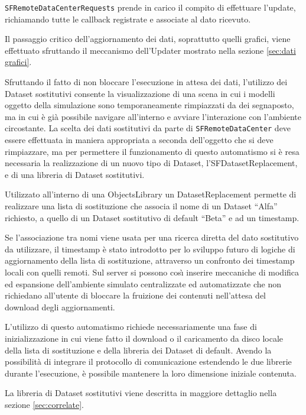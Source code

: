 \texttt{SFRemoteDataCenterRequests} prende in carico il compito di effettuare l'update, richiamando tutte le callback registrate e associate al dato ricevuto.

Il passaggio critico dell'aggiornamento dei dati, soprattutto quelli grafici, viene effettuato sfruttando il meccanismo dell'Updater mostrato nella sezione \ref{sec:dati grafici}.

Sfruttando il fatto di non bloccare l'esecuzione in attesa dei dati, l'utilizzo dei Dataset sostitutivi consente la visualizzazione di una scena in cui i modelli oggetto della simulazione sono temporaneamente rimpiazzati da dei segnaposto, ma in cui \`e gi\`a possibile navigare all'interno e avviare l'interazione con l'ambiente circostante. La scelta dei dati sostitutivi da parte di \texttt{SFRemoteDataCenter} deve essere effettuata in maniera appropriata a seconda dell'oggetto che si deve rimpiazzare, ma per permettere il funzionamento di questo automatismo si \`e resa necessaria la realizzazione di un nuovo tipo di Dataset, l'SFDatasetReplacement, e di una libreria di Dataset sostitutivi.

Utilizzato all'interno di una ObjectsLibrary un DatasetReplacement permette di realizzare una lista di sostituzione che associa il nome di un Dataset ``Alfa'' richiesto, a quello di un Dataset sostitutivo di default ``Beta'' e ad un timestamp.

Se l'associazione tra nomi viene usata per una ricerca diretta del dato sostitutivo da utilizzare, il timestamp \`e stato introdotto per lo sviluppo futuro di logiche di aggiornamento della lista di sostituzione, attraverso un confronto dei timestamp locali con quelli remoti. Sul server si possono cos{\`\i} inserire meccaniche di modifica ed espansione dell'ambiente simulato centralizzate ed automatizzate che non richiedano all'utente di bloccare la fruizione dei contenuti nell'attesa del download degli aggiornamenti.

L'utilizzo di questo automatismo richiede necessariamente una fase di inizializzazione in cui viene fatto il download o il caricamento da disco locale della lista di sostituzione e della libreria dei Dataset di default. Avendo la possibilit\`a di integrare il protocollo di comunicazione estendendo le due librerie durante l'esecuzione, \`e possibile mantenere la loro dimensione iniziale contenuta.

La libreria di Dataset sostitutivi viene descritta in maggiore dettaglio nella sezione \ref{sec:correlate}.

